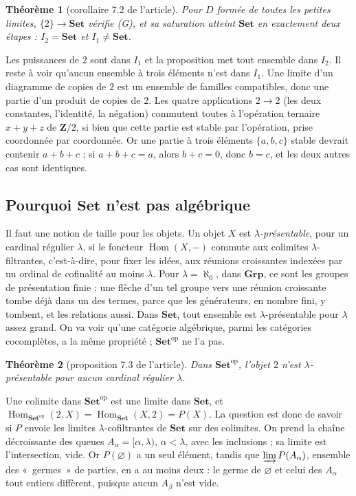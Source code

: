 \documentclass[11pt,a4paper]{amsart}
\theoremstyle{definition}
\theoremstyle{plain}
\newtheorem{theoreme}{Théorème}
\theoremstyle{remark}
\newcommand{\Set}{\mathbf{Set}}
\newcommand{\Grp}{\mathbf{Grp}}
\newcommand{\Hom}{\operatorname{Hom}}
\begin{document}
\begin{theoreme}[corollaire 7.2 de l'article]
Pour $D$ formée de toutes les petites limites, $\{2\}\to\Set$ vérifie (G), et sa saturation atteint $\Set$ en exactement deux étapes : $I_2=\Set$ et $I_1\ne\Set$.
\end{theoreme}

Les puissances de $2$ sont dans $I_1$ et la proposition met tout ensemble dans $I_2$. Il reste à voir qu'aucun ensemble à trois éléments n'est dans $I_1$. Une limite d'un diagramme de copies de $2$ est un ensemble de familles compatibles, donc une partie d'un produit de copies de $2$. Les quatre applications $2\to2$ (les deux constantes, l'identité, la négation) commutent toutes à l'opération ternaire $x+y+z$ de $\mathbf Z/2$, si bien que cette partie est stable par l'opération, prise coordonnée par coordonnée. Or une partie à trois éléments $\{a,b,c\}$ stable devrait contenir $a+b+c$ ; si $a+b+c=a$, alors $b+c=0$, donc $b=c$, et les deux autres cas sont identiques.

\subsection{Pourquoi $\Set$ n'est pas algébrique}

Il faut une notion de taille pour les objets. Un objet $X$ est \emph{$\lambda$-présentable}, pour un cardinal régulier $\lambda$, si le foncteur $\Hom(X,-)$ commute aux colimites $\lambda$-filtrantes, c'est-à-dire, pour fixer les idées, aux réunions croissantes indexées par un ordinal de cofinalité au moins $\lambda$. Pour $\lambda=\aleph_0$, dans $\Grp$, ce sont les groupes de présentation finie : une flèche d'un tel groupe vers une réunion croissante tombe déjà dans un des termes, parce que les générateurs, en nombre fini, y tombent, et les relations aussi. Dans $\Set$, tout ensemble est $\lambda$-présentable pour $\lambda$ assez grand. On va voir qu'une catégorie algébrique, parmi les catégories cocomplètes, a la même propriété ; $\Set^{\mathrm{op}}$ ne l'a pas.

\begin{theoreme}[proposition 7.3 de l'article]
Dans $\Set^{\mathrm{op}}$, l'objet $2$ n'est $\lambda$-présentable pour aucun cardinal régulier $\lambda$.
\end{theoreme}

Une colimite dans $\Set^{\mathrm{op}}$ est une limite dans $\Set$, et $\Hom_{\Set^{\mathrm{op}}}(2,X)=\Hom_\Set(X,2)=P(X)$. La question est donc de savoir si $P$ envoie les limites $\lambda$-cofiltrantes de $\Set$ sur des colimites. On prend la chaîne décroissante des queues $A_\alpha=[\alpha,\lambda)$, $\alpha<\lambda$, avec les inclusions ; sa limite est l'intersection, vide. Or $P(\varnothing)$ a un seul élément, tandis que $\varinjlim P(A_\alpha)$, ensemble des «~germes~» de parties, en a au moins deux : le germe de $\varnothing$ et celui des $A_\alpha$ tout entiers diffèrent, puisque aucun $A_\beta$ n'est vide.
\end{document}
